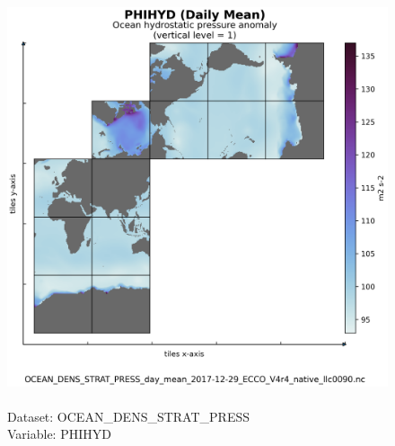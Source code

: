 \begin{figure}[H]
\centering
\includegraphics[scale=0.5]{../images/plots/native_plots/Ocean_Density_Stratification_and_Hydrostatic_Pressure/PHIHYD.png}
\caption{\\Dataset: OCEAN\_DENS\_STRAT\_PRESS\\Variable: PHIHYD}
\label{tab:table-OCEAN_DENS_STRAT_PRESS_PHIHYD-Plot}
\end{figure}
\pagebreak

